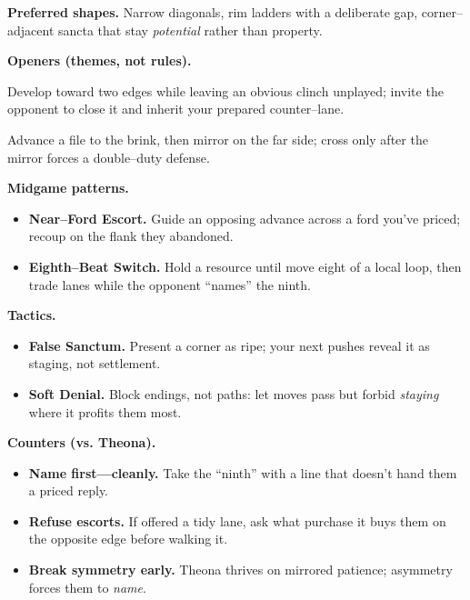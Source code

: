 \documentclass[11pt]{article}
\numberwithin{equation}{section} %
\theoremstyle{plain} %
\theoremstyle{definition} %
\theoremstyle{remark} %
\begin{document}
\medskip
\noindent\textbf{Preferred shapes.} Narrow diagonals, rim ladders with a deliberate gap, corner–adjacent sancta that stay \emph{potential} rather than property.

\medskip
\noindent\textbf{Openers (themes, not rules).}
\begin{description}\setlength\itemsep{0.35em}
  \item[\textit{Empty Chair.}] Develop toward two edges while leaving an obvious clinch unplayed; invite the opponent to close it and inherit your prepared counter–lane.
  \item[\textit{Unpoured Cup.}] Advance a file to the brink, then mirror on the far side; cross only after the mirror forces a double–duty defense.
\end{description}

\medskip
\noindent\textbf{Midgame patterns.}
\begin{itemize}\setlength\itemsep{0.25em}
  \item \textbf{Near–Ford Escort.} Guide an opposing advance across a ford you’ve priced; recoup on the flank they abandoned.
  \item \textbf{Eighth–Beat Switch.} Hold a resource until move eight of a local loop, then trade lanes while the opponent “names” the ninth.
\end{itemize}

\medskip
\noindent\textbf{Tactics.}
\begin{itemize}\setlength\itemsep{0.25em}
  \item \textbf{False Sanctum.} Present a corner as ripe; your next pushes reveal it as staging, not settlement.
  \item \textbf{Soft Denial.} Block endings, not paths: let moves pass but forbid \emph{staying} where it profits them most.
\end{itemize}

\medskip
\noindent\textbf{Counters (vs. Theona).}
\begin{itemize}\setlength\itemsep{0.25em}
  \item \textbf{Name first—cleanly.} Take the “ninth” with a line that doesn’t hand them a priced reply.
  \item \textbf{Refuse escorts.} If offered a tidy lane, ask what purchase it buys them on the opposite edge before walking it.
  \item \textbf{Break symmetry early.} Theona thrives on mirrored patience; asymmetry forces them to \emph{name}.
\end{itemize}
\end{document}
